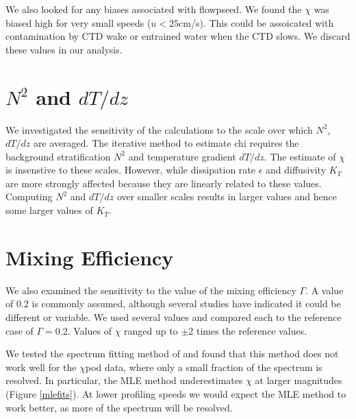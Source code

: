 \documentclass{ametsoc}
\begin{document}
We also looked for any biases associated with flowpseed. We found the $\chi$ was biased high for very small speeds ($u<25$cm/s). This could be assoicated with contamination by CTD wake or entrained water when the CTD slows. We discard these values in our analysis.



\section{$N^2$ and $dT/dz$}

We investigated the sensitivity of the calculations to the scale over which $N^2$, $dT/dz$ are averaged. The iterative method to estimate chi requires the background stratification $N^2$ and temperature gradient $dT/dz$. The estimate of $\chi$ is insenstive to these scales. However, while dissipation rate $\epsilon$ and diffusivity $K_T$ are more strongly affected because they are linearly related to these values. Computing $N^2$ and $dT/dz$ over smaller scales results in larger values and hence some larger values of $K_T$.

\section{Mixing Efficiency}

We also examined the sensitivity to the value of the mixing efficiency $\Gamma$. A value of $0.2$ is commonly assumed, although several studies have indicated it could be different or variable. We used several values and compared each to the reference case of $\Gamma=0.2$. Values of $\chi$ ranged up to $\pm$2 times the reference values.



\appendix[B]


We tested the spectrum fitting method of \cite{ruddicketal00} and found that this method does not work well for the $\chi$pod data, where only a small fraction of the spectrum is resolved. In particular, the MLE method underestimates $\chi$ at larger magnitudes (Figure \ref{mlefits}). At lower profiling speeds we would expect the MLE method to work better, as more of the spectrum will be resolved.


\appendix[D]
\end{document}
